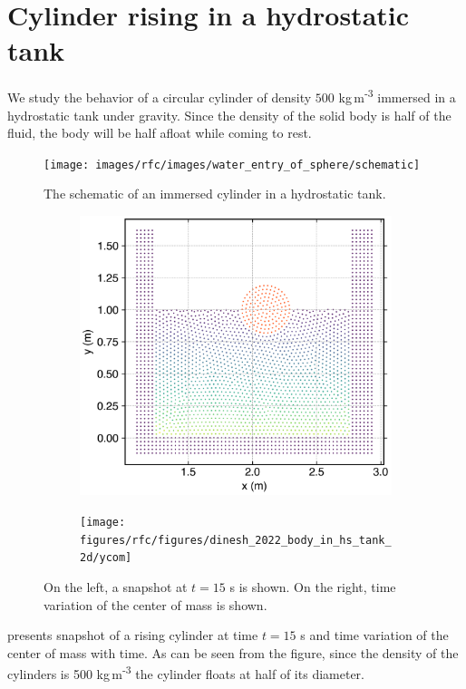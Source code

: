 \FloatBarrier%
\section{Cylinder rising in a hydrostatic tank}
\label{sec:water-entry-sphere}
We study the behavior of a circular cylinder of density $500$
kg\,m\textsuperscript{-3} immersed in a hydrostatic tank under gravity. Since
the density of the solid body is half of the fluid, the body will be half afloat
while coming to rest.
\begin{figure}[!htpb]
  \centering
    \texttt{[image: images/rfc/images/water\_entry\_of\_sphere/schematic]}
  \caption{The schematic of an immersed cylinder in a hydrostatic tank.}
\label{fig:raising-falling-solid-in-water}
\end{figure}

\begin{figure}[!htpb]
  \centering
  \begin{subfigure}{0.48\textwidth}
    \centering
    \includegraphics[width=1.0\textwidth]{figures/rfc/figures/dinesh_2022_body_in_hs_tank_2d/time11}
  \end{subfigure}
  \begin{subfigure}{0.48\textwidth}
    \centering
    \texttt{[image: figures/rfc/figures/dinesh\_2022\_body\_in\_hs\_tank\_2d/ycom]}
  \end{subfigure}
  \caption{
    On the left, a snapshot at $t=15$ s is shown. On the right,
    time variation of the center of mass is shown.}
\label{fig:snapshots-rising-solid-in-water}
\end{figure}
 presents snapshot of a rising
cylinder at time $t=15$ s and time variation of the center of mass with time. As
can be seen from the figure, since the density of the cylinders is 500
kg\,m\textsuperscript{-3} the cylinder floats at half of its diameter.
